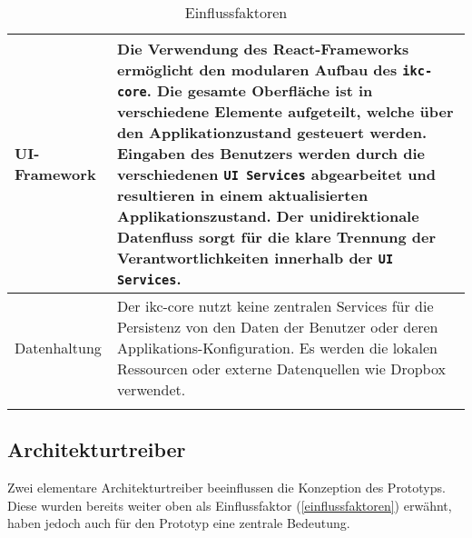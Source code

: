 \begin{longtable}{|p{4cm}|p{8.5cm}|}
    UI-Framework & Die Verwendung des \gls{React}-Frameworks ermöglicht den modularen Aufbau des \texttt{ikc-core}. Die gesamte Oberfläche ist in verschiedene Elemente aufgeteilt, welche über den Applikationzustand gesteuert werden. Eingaben des Benutzers werden durch die verschiedenen \texttt{UI Services} abgearbeitet und resultieren in einem aktualisierten Applikationszustand. Der unidirektionale Datenfluss sorgt für die klare Trennung der Verantwortlichkeiten innerhalb der \texttt{UI Services}. \\\hline
    
    Datenhaltung & Der \gls{ikc-core} nutzt keine zentralen Services für die Persistenz von den Daten der Benutzer oder deren Applikations-Konfiguration. Es werden die lokalen Ressourcen oder externe Datenquellen wie \gls{Dropbox} verwendet. \\\hline
    \caption{Einflussfaktoren}
  \label{tab:einflussfaktoren}
\end{longtable}




\subsection{Architekturtreiber}
Zwei elementare Architekturtreiber beeinflussen die Konzeption des Prototyps. Diese wurden bereits weiter oben als Einflussfaktor (\autoref{einflussfaktoren}) erwähnt, haben jedoch auch für den Prototyp eine zentrale Bedeutung.

